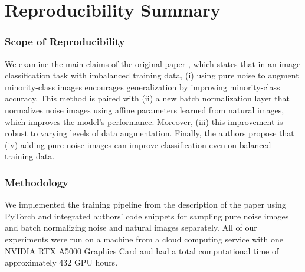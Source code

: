 \section*{\centering Reproducibility Summary}


\subsubsection*{Scope of Reproducibility}

We examine the main claims of the original paper \citep{PureNoise}, which states that in an image classification task with imbalanced training data, (i) using pure noise to augment minority-class images encourages generalization by improving minority-class accuracy. This method is paired with (ii) a new batch normalization layer that normalizes noise images using affine parameters learned from natural images, which improves the model's performance. Moreover, (iii) this improvement is robust to varying levels of data augmentation. Finally, the authors propose that (iv) adding pure noise images can improve classification even on balanced training data.

\subsubsection*{Methodology}

We implemented the training pipeline from the description of the paper using PyTorch and integrated authors' code snippets for sampling pure noise images and batch normalizing noise and natural images separately. All of our experiments were run on a machine from a cloud computing service with one NVIDIA RTX A5000 Graphics Card and had a total computational time of approximately 432 GPU hours.

